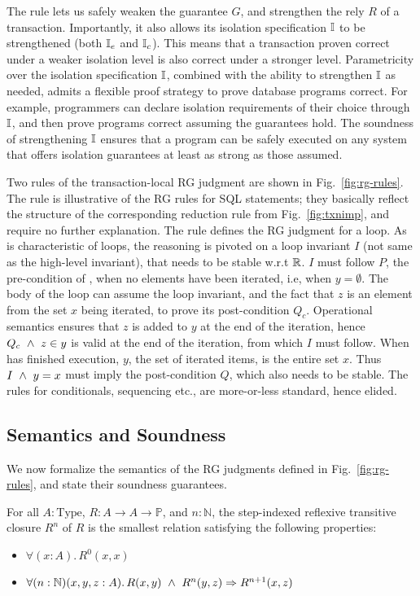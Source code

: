 The  rule lets us safely weaken the guarantee
$G$, and strengthen the rely $R$ of a transaction. Importantly, it
also allows its isolation specification $\mathbb{I}$ to be strengthened (both
$\mathbb{I}_e$ and $\mathbb{I}_c$). This means that a transaction proven correct under
a weaker isolation level is also correct under a stronger level.
Parametricity over the isolation specification $\mathbb{I}$, combined with the
ability to strengthen $\mathbb{I}$ as needed, admits a flexible proof strategy
to prove database programs correct. For example, programmers can
declare isolation requirements of their choice through $\mathbb{I}$, and then
prove programs correct assuming the guarantees hold. The soundness of
strengthening $\mathbb{I}$ ensures that a program can be safely executed on
any system that offers isolation guarantees at least as strong as
those assumed.

Two rules of the transaction-local RG judgment are shown in
Fig.~\ref{fig:rg-rules}. The rule  is
illustrative of the RG rules for SQL statements; they basically
reflect the structure of the corresponding reduction rule from
Fig.~\ref{fig:txnimp}, and require no further explanation. The rule
 defines the RG judgment for a  loop.
As is characteristic of loops, the reasoning is pivoted on a loop
invariant $I$ (not same as the high-level invariant), that needs to be
stable w.r.t $\mathbb{R}$. $I$ must follow $P$, the pre-condition of
, when no elements have been iterated, i.e, when
$y=\emptyset$. The body of the loop can assume the loop invariant, and
the fact that $z$ is an element from the set $x$ being iterated, to
prove its post-condition $Q_c$. Operational semantics ensures that $z$
is added to $y$ at the end of the iteration, hence $Q_c ~\wedge~ z\in y$
is valid at the end of the iteration, from which $I$ must follow. When
 has finished execution, $y$, the set of iterated items, is
the entire set $x$. Thus $I ~\wedge~ y=x$ must imply the post-condition
$Q$, which also needs to be stable. The rules for conditionals,
sequencing etc., are more-or-less standard, hence elided.

\subsection{Semantics and Soundness}

We now formalize the semantics of the RG judgments defined in
Fig.~\ref{fig:rg-rules}, and state their soundness guarantees.

\begin{definition}
For all $A:\text{Type}$, $R: A \rightarrow A \rightarrow \mathbb{P}$, and $n :
\mathbb{N}$, the step-indexed reflexive transitive closure $R^n$ of $R$ is
the smallest relation satisfying the following
properties:
\begin{itemize}
\item $\forall (x:A).\, R^0 (x,x)$
\item $\forall (n:\mathbb{N})(x,y,z : A).\, R(x,y) ~\wedge~ R^n(y,z) \Rightarrow
R^{n+1}(x,z)$
\end{itemize}
\end{definition}

